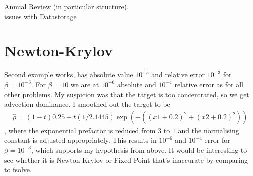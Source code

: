 \documentclass[11pt, a4paper]{article}
\theoremstyle{definition}
\newcommand{\hr}{\widehat \rho}
\begin{document}
Annual Review (in particular structure).\\
issues with Datastorage
\section{Newton-Krylov}
Second example works, has absolute value $10^{-5}$ and relative error $10^{-3}$ for $\beta = 10^{-3}$. For $\beta = 10$ we are at $10^{-6}$ absolute and $10^{-4}$ relative error as for all other problems.
My suspicion was that the target is too concentrated, so we get advection dominance. I smoothed out the target to be
\begin{align*}
	\hr = (1-t)0.25 + t(1/2.1445)\exp(-((x1+0.2)^2 + (x2+0.2)^2))
\end{align*},
where the exponential prefactor is reduced from $3$ to $1$ and the normalising constant is adjusted appropriately.
This results in $10^{-6}$ and $10^{-4}$ error for $\beta = 10^{-3}$, which supports my hypothesis from above. It would be interesting to see whether it is Newton-Krylov or Fixed Point that's inaccurate by comparing to fsolve.
\end{document}
